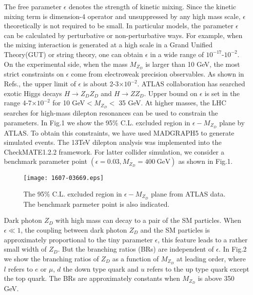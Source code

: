 \documentclass{article}
\begin{document}
 The free parameter $\epsilon$ denotes the strength of kinetic mixing. Since the kinetic mixing term is dimension-4 operator and unsuppressed by any high mass scale,  $\epsilon$  theoretically is not required to be small. In particular models, the parameter $\epsilon$ can be calculated by perturbative or non-perturbative ways\cite{1311.0029}.
For example, when the mixing interaction is generated at a high scale in a Grand Unified Theory(GUT) or string theory, one can obtain $\epsilon$ in a wide range of $10^{-17}$-$10^{-2}$\cite{2U1,0903.3941,0810.0714,EPSILON}.
 On the experimental side, when the mass $M_{Z_D}$ is larger than  10 GeV, the most strict constraints on $\epsilon$ come from electroweak precision observables. As shown in Refs.\cite{1408.1075,1412.0018}, the upper limit of $\epsilon$ is about 2-3$\times 10^{-2}$.  ATLAS collaboration has searched exotic Higgs decays  $H\rightarrow Z_DZ_D$ and $H\rightarrow ZZ_D$. Upper bound on $\epsilon$ is set in the range 4-7$\times 10^{-2}$ for 10 GeV$ <M_{Z_D}< $ 35  GeV\cite{1505.07645}. At higher masses, the LHC searches for high-mass dilepton resonances can be used to constrain the  parameters. In Fig.1 we show the 95\% C.L. excluded region in $\epsilon - M_{Z_D}$ plane by ATLAS\cite{1607.03669}. To obtain this constraints, we have used MADGRAPH5\cite{MG5} to generate simulated events. The 13TeV dilepton analysis was implemented into the CheckMATE1.2.2 framework\cite{1503.01123}. 
 For latter collider simulation, we consider a benchmark parameter point $(\epsilon=0.03, M_{Z_D}=400\ \text{GeV})$ as shown in Fig.1.
\begin{figure}
\begin{center}
\texttt{[image: 1607-03669.eps]}
\caption{The 95\% C.L. excluded region in $\epsilon - M_{Z_D}$ plane from ATLAS data. The benchmark parmeter point is also indicated.}
\end{center}
\end{figure}
 
 Dark photon $Z_D$ with high mass can decay to a pair of the SM particles. When $\epsilon\ll1$, the  coupling  between dark photon $Z_D$ and the SM particles is approximately proportional to the tiny parameter $\epsilon$, this feature leads to a rather small width of $Z_D$. But the branching ratios (BRs)  are independent of $\epsilon$. In Fig.2 we show the branching ratios of $Z_D$  as a function of $M_{Z_D}$ at leading order, where $l$ refers to  $e$ or $\mu $, $d$ the down type quark and $u$ refers to the up type quark except the top quark. The BRs are approximately constants when $M_{Z_D}$ is above 350 GeV.  
 
\end{document}
